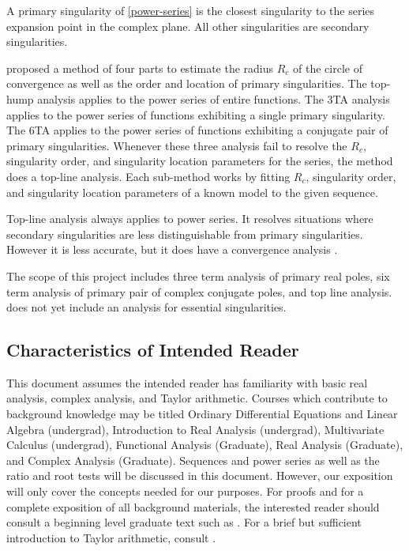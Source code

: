\documentclass[12pt]{article}
\begin{document}
A primary singularity of \eqref{power-series} is the closest singularity to the series
expansion point in the complex plane. All other singularities are secondary singularities.

\cite{chang1982} proposed a method of four parts to estimate the radius $R_c$ of the circle of convergence
as well as the order and location of primary singularities. The top-hump analysis applies to
the power series of entire functions. The 3TA analysis applies to the power series of
functions exhibiting a single primary singularity. The 6TA applies to the
power series of functions exhibiting a conjugate pair of primary singularities.
Whenever these three analysis fail to resolve the $R_c$, singularity order, and
singularity location parameters for the series, the \cite{chang1982} method does
a top-line analysis. Each \cite{chang1982} sub-method works by fitting $R_c$, singularity order, and
singularity location parameters of a known model to the given sequence.

Top-line analysis always applies to power series. It resolves situations where secondary singularities are
less distinguishable from primary singularities. However it is less accurate, but it does
have a convergence analysis \citep{chang1982}.

The scope of this  project includes three term analysis of primary real poles,
six term analysis of primary pair of complex conjugate poles, and top line analysis.
 does not yet include an analysis for essential singularities.

\subsection{Characteristics of Intended Reader} \label{sec_IntendedReader}

This document assumes the intended reader has familiarity with basic real analysis, complex analysis,
and Taylor arithmetic.
Courses which contribute to background knowledge may be titled Ordinary Differential Equations and
Linear Algebra (undergrad), Introduction to Real Analysis (undergrad),
Multivariate Calculus (undergrad), Functional Analysis (Graduate), Real Analysis (Graduate),
and Complex Analysis (Graduate).
Sequences and power series as well as the ratio and root tests will be discussed
in this document. However, our exposition will only cover the concepts needed for our purposes. For proofs
and for a complete exposition of all background materials, the interested reader should consult a beginning
level graduate text such as \cite{rudin1976}. For a brief but sufficient introduction to Taylor arithmetic,
consult \cite{TADIFF}.
\end{document}
